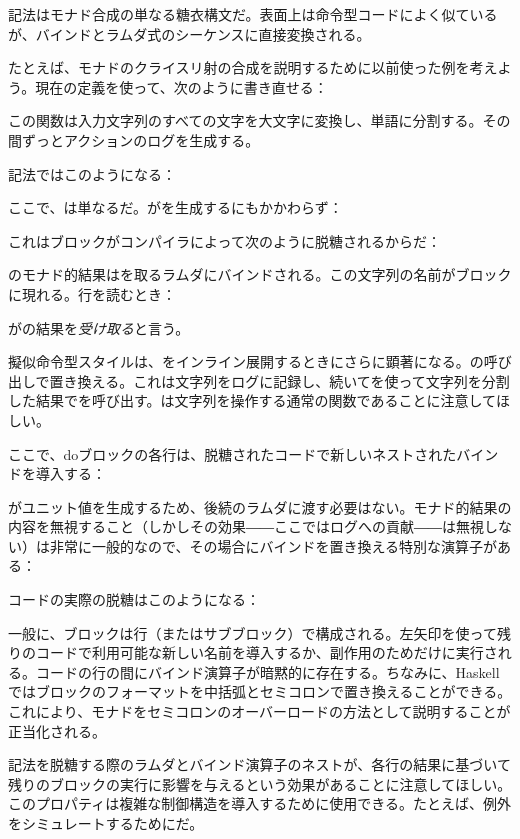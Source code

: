 記法はモナド合成の単なる糖衣構文だ。表面上は命令型コードによく似ているが、バインドとラムダ式のシーケンスに直接変換される。

たとえば、モナドのクライスリ射の合成を説明するために以前使った例を考えよう。現在の定義を使って、次のように書き直せる：

この関数は入力文字列のすべての文字を大文字に変換し、単語に分割する。その間ずっとアクションのログを生成する。

記法ではこのようになる：

ここで、は単なるだ。がを生成するにもかかわらず：

これはブロックがコンパイラによって次のように脱糖されるからだ：

のモナド的結果はを取るラムダにバインドされる。この文字列の名前がブロックに現れる。行を読むとき：

がの結果を\emph{受け取る}と言う。

擬似命令型スタイルは、をインライン展開するときにさらに顕著になる。の呼び出しで置き換える。これは文字列をログに記録し、続いてを使って文字列を分割した結果でを呼び出す。は文字列を操作する通常の関数であることに注意してほしい。

ここで、doブロックの各行は、脱糖されたコードで新しいネストされたバインドを導入する：

がユニット値を生成するため、後続のラムダに渡す必要はない。モナド的結果の内容を無視すること（しかしその効果――ここではログへの貢献――は無視しない）は非常に一般的なので、その場合にバインドを置き換える特別な演算子がある：

コードの実際の脱糖はこのようになる：

一般に、ブロックは行（またはサブブロック）で構成される。左矢印を使って残りのコードで利用可能な新しい名前を導入するか、副作用のためだけに実行される。コードの行の間にバインド演算子が暗黙的に存在する。ちなみに、Haskellではブロックのフォーマットを中括弧とセミコロンで置き換えることができる。これにより、モナドをセミコロンのオーバーロードの方法として説明することが正当化される。

記法を脱糖する際のラムダとバインド演算子のネストが、各行の結果に基づいて残りのブロックの実行に影響を与えるという効果があることに注意してほしい。このプロパティは複雑な制御構造を導入するために使用できる。たとえば、例外をシミュレートするためにだ。

